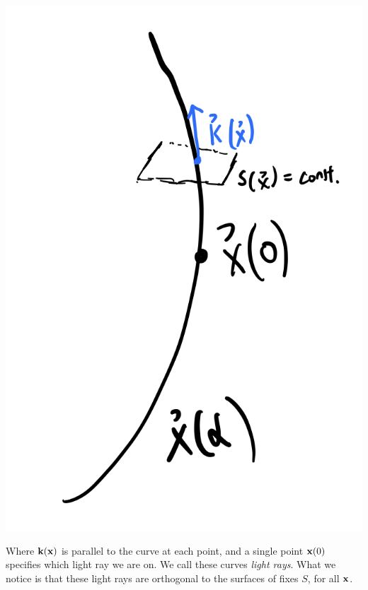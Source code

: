 \begin{center}
    \includegraphics[scale=0.3]{Lectures/Images/lec17-ray.png}
\end{center}

Where $\mathbf{k}(\mathbf{x})$ is parallel to the curve at each point, and a single point $\mathbf{x}(0)$ specifies which light ray we are on. We call these curves \emph{light rays}. What we notice is that these light rays are orthogonal to the surfaces of fixes $S$, for all $\mathbf{x}$.

